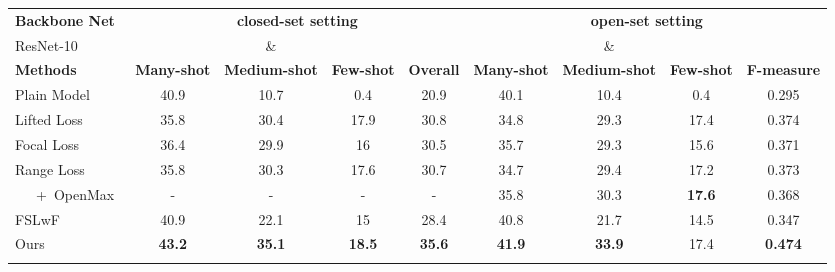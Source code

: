 \documentclass[10pt,twocolumn,letterpaper]{article}
\begin{document}
\begin{table*}
\footnotesize

\begin{subtable}{\linewidth}
\centering
\bgroup
\begin{tabular}{l|cccc|cccc}
\Xhline{1pt}
\textbf{Backbone Net} & \multicolumn{4}{c|}{\footnotesize{\textbf{closed-set setting}}} & \multicolumn{4}{c}{\footnotesize{\textbf{open-set setting}}} \\
ResNet-10 &  &  \&  &  &&  &  \&  &  &\\
\textbf{Methods} & \textbf{Many-shot} & \textbf{Medium-shot} & \textbf{Few-shot} & \textbf{Overall} & \textbf{Many-shot} & \textbf{Medium-shot} & \textbf{Few-shot} & \textbf{F-measure} \\
\hline\hline
Plain Model~\cite{he2016deep} & 40.9 & 10.7 & 0.4 & 20.9 & 40.1 & 10.4 & 0.4 & 0.295 \\
Lifted Loss~\cite{oh2016deep} & 35.8 & 30.4 & 17.9 & 30.8 & 34.8 & 29.3 & 17.4 & 0.374 \\
Focal Loss~\cite{lin2017focal} & 36.4 & 29.9 & 16 & 30.5 & 35.7 & 29.3 & 15.6 & 0.371 \\
Range Loss~\cite{zhang2017range} & 35.8 & 30.3 & 17.6 & 30.7 & 34.7 & 29.4 & 17.2 & 0.373 \\
~~~+~OpenMax~\cite{bendale2016towards} & - & - & - & - & 35.8 & 30.3 & \textbf{17.6} & 0.368 \\
FSLwF~\cite{gidaris2018dynamic} & 40.9 & 22.1 & 15 & 28.4 & 40.8 & 21.7 & 14.5 & 0.347 \\
\hline
Ours & \textbf{43.2} & \textbf{35.1} & \textbf{18.5} & \textbf{35.6} & \textbf{41.9} & \textbf{33.9} & 17.4 & \textbf{0.474} \\
\Xhline{1pt}
\end{tabular}\vspace{-5pt}
\egroup
{}
\end{subtable}


\end{table*}
\end{document}
